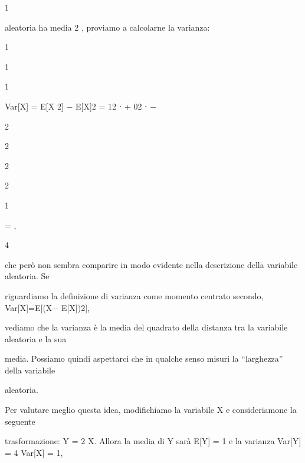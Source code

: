 \documentclass[a4paper,portrait,12pt]{article}
\begin{document}
1


\begin{flushleft}
aleatoria ha media 2 , proviamo a calcolarne la varianza:
\end{flushleft}


1


1


1


\begin{flushleft}
Var[X] = E[X 2] $-$ E[X]2 = 12 ⋅ + 02 ⋅ $-$
\end{flushleft}


2


2


2





2





1


= ,


4





\begin{flushleft}
che per\`{o} non sembra comparire in modo evidente nella descrizione della variabile aleatoria. Se
\end{flushleft}


\begin{flushleft}
riguardiamo la definizione di varianza come momento centrato secondo, Var[X]=E[(X$-$ E[X])2],
\end{flushleft}


\begin{flushleft}
vediamo che la varianza \`{e} la media del quadrato della distanza tra la variabile aleatoria e la sua
\end{flushleft}


\begin{flushleft}
media. Possiamo quindi aspettarci che in qualche senso misuri la {``}larghezza'' della variabile
\end{flushleft}


\begin{flushleft}
aleatoria.
\end{flushleft}


\begin{flushleft}
Per valutare meglio questa idea, modifichiamo la variabile X e consideriamone la seguente
\end{flushleft}


\begin{flushleft}
trasformazione: Y = 2 X. Allora la media di Y sar\`{a} E[Y] = 1 e la varianza Var[Y] = 4 Var[X] = 1,
\end{flushleft}
\end{document}
